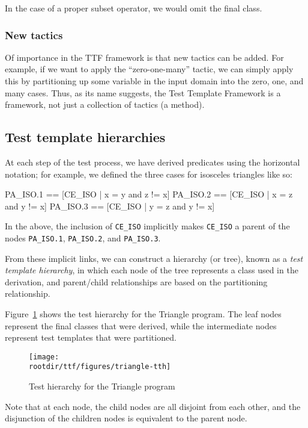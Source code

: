 In the case of a proper subset operator, we would omit the final class.

\subsubsection{New tactics}

Of importance in the TTF framework is that new tactics can be added. For example, if we want to apply the ``zero-one-many'' tactic, we can simply apply this by partitioning up some variable in the input domain into the zero, one, and many cases. Thus, as its name suggests, the Test Template Framework is a framework, not just a  collection of tactics (a method).

\subsection{Test template hierarchies}

At each step of the test process, we have derived predicates using the horizontal notation; for example, we defined the three cases for isosceles triangles like so:

\lstset{aboveskip=3mm}
\lstset{language=}
\begin{alloy}
 PA_ISO.1 == [CE_ISO | x = y and z != x]
 PA_ISO.2 == [CE_ISO | x = z and y != x]
 PA_ISO.3 == [CE_ISO | y = z and y != x]
\end{alloy}

In the above, the inclusion of \texttt{CE\_ISO} implicitly makes \texttt{CE\_ISO} a parent of the nodes \texttt{PA\_ISO.1}, \texttt{PA\_ISO.2}, and \texttt{PA\_ISO.3}. 

From these implicit links, we can construct a hierarchy (or tree), known as a \emph{test template hierarchy}, in which each node of the tree represents a class used in the derivation, and parent/child relationships are based on the partitioning relationship.

Figure~\ref{fig:ttf:triangle-hierarchy} shows the test hierarchy for the Triangle program. The leaf nodes represent the final classes that were derived, while the intermediate nodes represent test templates that were partitioned.

\begin{figure}[!ht]
\centering
\texttt{[image: \\rootdir/ttf/figures/triangle-tth]}
\caption{Test hierarchy for the Triangle program}
\label{fig:ttf:triangle-hierarchy}
\end{figure}

Note that at each node, the child nodes are all disjoint from each other, and the disjunction of the children nodes is equivalent to the parent node. 

